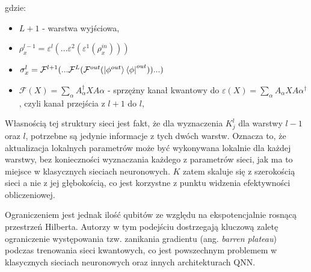 gdzie:
\begin{itemize}
    \item $L+1$ - warstwa wyjściowa,
    \item $\rho_x^{l-1}=\varepsilon^l(...\varepsilon^2(\varepsilon^1(\rho_x^{in})))$
    \item $\sigma_x^l =\mathcal{F}^{l+1}(...\mathcal{F}^L(\mathcal{F}^{out}(\ket{\phi^{out}}\bra{\phi}^{out}))...) $
    \item $\mathcal{F}(X) = \sum_{\alpha}A_{\alpha}^{\dagger}XA{\alpha}$ - sprzężny kanał kwantowy do $\varepsilon(X)=\sum_{\alpha}A_{\alpha}XA{\alpha}^{\dagger}$, czyli kanał przejścia z $l+1$ do $l$,
\end{itemize}

Własnością tej struktury sieci jest fakt, że dla wyznaczenia $K_j^l$ dla warstwy $l-1$ oraz $l$, potrzebne są jedynie informacje z tych dwóch warstw. Oznacza to, że aktualizacja lokalnych parametrów może być wykonywana lokalnie dla każdej warstwy, bez konieczności wyznaczania każdego z parametrów sieci, jak ma to miejsce w klasycznych sieciach neuronowych. $K$ zatem skaluje się z szerokością sieci a nie z jej głębokością, co jest korzystne z punktu widzenia efektywności obliczeniowej.

Ograniczeniem jest jednak ilość qubitów ze względu na ekspotencjalnie rosnącą przestrzeń Hilberta. Autorzy w tym podejściu dostrzegają kluczową zaletę ograniczenie występowania tzw. zanikania gradientu (ang. \textit{barren plateau}) podczas trenowania sieci kwantowych, co jest powszechnym problemem w klasycznych sieciach neuronowych oraz innych architekturach QNN.

